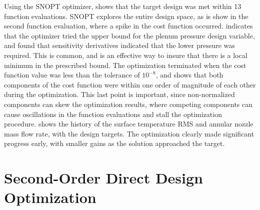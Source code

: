 Using the SNOPT optimizer,  shows that the target
design was met within 13 function evaluations.  SNOPT explores the entire design
space, as is show in the second function evaluation, where a spike in the cost
function occurred.
 indicates that the optimizer tried the upper
bound for the plenum pressure design variable, and found that sensitivity
derivatives indicated that the lower pressure was required. This is common, and
is an effective way to insure that there is a local minimum in the prescribed
bound.  The optimization terminated when the cost function value was less than
the tolerance of $10^{-8}$, and  shows that both
components of the cost function were within one order of magnitude of each other
during the optimization.  This last point is important, since non-normalized
components can skew the optimization results, where competing components can
cause oscillations in the function evaluations and stall the optimization
procedure.   shows the history of the surface
temperature RMS and annular nozzle mass flow rate, with the design targets.  The
optimization clearly made significant progress early, with smaller gains as the
solution approached the target.

\section{Second-Order Direct Design Optimization}
\label{sec:2nd-order-direct-design}

